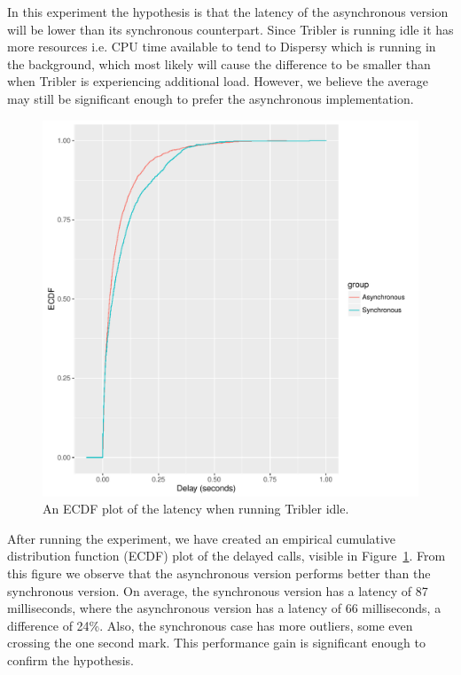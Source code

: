 In this experiment the hypothesis is that the latency of the asynchronous version will be lower than its synchronous counterpart.
Since Tribler is running idle it has more resources i.e. CPU time available to tend to Dispersy which is running in the background, which most likely will cause the difference to be smaller than when Tribler is experiencing additional load.
However, we believe the average may still be significant enough to prefer the asynchronous implementation.

\begin{figure}[!h]
	\centering
	\includegraphics[width=\linewidth]{experimentation/images/ecdf_latency_idle}
	\caption{An ECDF plot of the latency when running Tribler idle.}
	\label{fig:ecdf_latency_idle}
\end{figure} 

After running the experiment, we have created an empirical cumulative distribution function (ECDF) plot of the delayed calls, visible in Figure~\ref{fig:ecdf_latency_idle}.
From this figure we observe that the asynchronous version performs better than the synchronous version.
On average, the synchronous version has a latency of 87 milliseconds, where the asynchronous version has a latency of 66 milliseconds, a difference of 24\%.
Also, the synchronous case has more outliers, some even crossing the one second mark.
This performance gain is significant enough to confirm the hypothesis.

